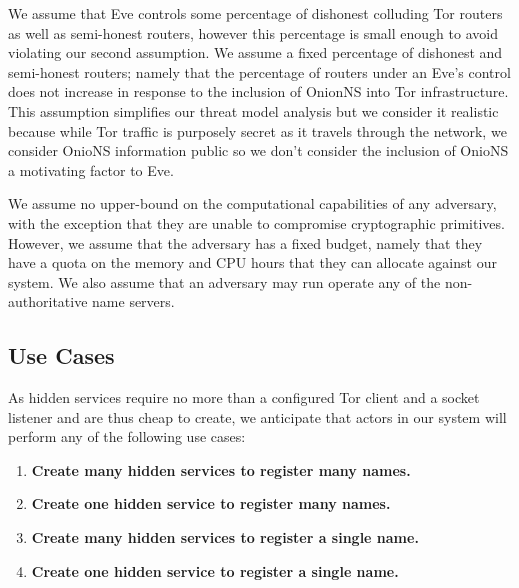 \documentclass[USenglish,oneside,twocolumn]{article}
\begin{document}
We assume that Eve controls some percentage of dishonest colluding Tor routers as well as semi-honest routers, however this percentage is small enough to avoid violating our second assumption. We assume a fixed percentage of dishonest and semi-honest routers; namely that the percentage of routers under an Eve's control does not increase in response to the inclusion of OnionNS into Tor infrastructure. This assumption simplifies our threat model analysis but we consider it realistic because while Tor traffic is purposely secret as it travels through the network, we consider OnioNS information public so we don't consider the inclusion of OnioNS a motivating factor to Eve.


We assume no upper-bound on the computational capabilities of any adversary, with the exception that they are unable to compromise cryptographic primitives. However, we assume that the adversary has a fixed budget, namely that they have a quota on the memory and CPU hours that they can allocate against our system. We also assume that an adversary may run operate any of the non-authoritative name servers.


\subsection{Use Cases}
\label{sec:useCases}

As hidden services require no more than a configured Tor client and a socket listener and are thus cheap to create, we anticipate that actors in our system will perform any of the following use cases:

\begin{enumerate}
	\item \textbf{Create many hidden services to register many names.}
	\item \textbf{Create one hidden service to register many names.}
	\item \textbf{Create many hidden services to register a single name.}
	\item \textbf{Create one hidden service to register a single name.}
\end{enumerate}
\end{document}
